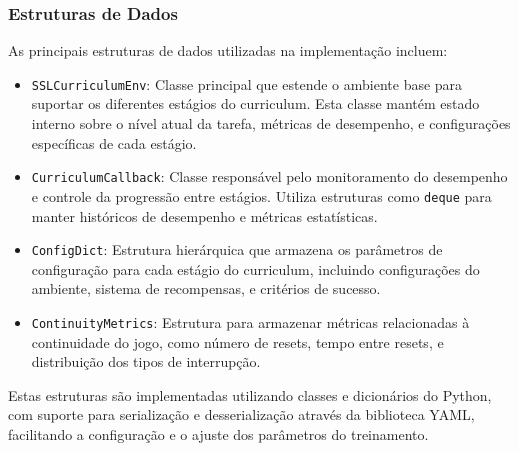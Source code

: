 \subsubsection{Estruturas de Dados}

As principais estruturas de dados utilizadas na implementação incluem:

\begin{itemize}
    \item \texttt{SSLCurriculumEnv}: Classe principal que estende o ambiente base para suportar os diferentes estágios do curriculum. Esta classe mantém estado interno sobre o nível atual da tarefa, métricas de desempenho, e configurações específicas de cada estágio.
    
    \item \texttt{CurriculumCallback}: Classe responsável pelo monitoramento do desempenho e controle da progressão entre estágios. Utiliza estruturas como \texttt{deque} para manter históricos de desempenho e métricas estatísticas.
    
    \item \texttt{ConfigDict}: Estrutura hierárquica que armazena os parâmetros de configuração para cada estágio do curriculum, incluindo configurações do ambiente, sistema de recompensas, e critérios de sucesso.
    
    \item \texttt{ContinuityMetrics}: Estrutura para armazenar métricas relacionadas à continuidade do jogo, como número de resets, tempo entre resets, e distribuição dos tipos de interrupção.
\end{itemize}

Estas estruturas são implementadas utilizando classes e dicionários do Python, com suporte para serialização e desserialização através da biblioteca YAML, facilitando a configuração e o ajuste dos parâmetros do treinamento.



